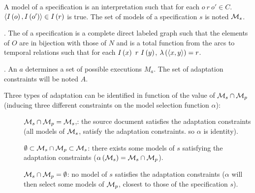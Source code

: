 \begin{defi}
A model of a specification  is an interpretation  such that for each $o\ r\ o'\in C$. $\left\langle I\left(o\right),I\left(o'\right)\right\rangle\in I\left(r\right)$ is true. The set of models of a specification $s$ is noted $\mathcal{M}_s$.
\cite{conf/ijcai/EuzenatLD03}
\end{defi}

\begin{defi}.
The   of a specification  is a complete direct labeled graph  such that the elements of $O$ are in bijection with those of $N$ and  is a total function from the arcs to temporal relations such that for each $I\left(x\right)\ r\ I\left(y\right)$, $\lambda\left(\left\langle x,y\right\rangle\right)=r$.
\cite{conf/ijcai/EuzenatLD03}
\end{defi}

\begin{defi}.
An  $a$ determines a set of possible executions $M_a$. The set of adaptation constraints will be noted $A$.
\cite{conf/ijcai/EuzenatLD03}
\end{defi}

\begin{defi}
Three types of adaptation can be identified in function of the value of $\mathcal{M}_s\cap\mathcal{M}_p$ (inducing three different constraints on the model selection function $\alpha$):
\begin{description}
 \item [] $\mathcal{M}_s\cap\mathcal{M}_p=\mathcal{M}_s$,: the source document satisfies the adaptation constraints (all models of $\mathcal{M}_s$, satisfy the adaptation constraints. so $\alpha$ is identity).
 \item [] $\emptyset\subset\mathcal{M}_s\cap\mathcal{M}_p\subset\mathcal{M}_s$: there exists some models of $s$ satisfying the adaptation constraints ($\alpha\left(\mathcal{M}_s\right)=\mathcal{M}_s\cap\mathcal{M}_p$).
 \item [] $\mathcal{M}_s\cap\mathcal{M}_p=\emptyset$: no model of $s$ satisfies the adaptation constraints ($\alpha$ will then select some models of $\mathcal{M}_p$, closest to those of the specification $s$).
\end{description}
\cite{conf/ijcai/EuzenatLD03}
\end{defi}

